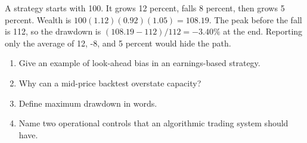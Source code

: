 \begin{worked}
A strategy starts with 100. It grows 12 percent, falls 8 percent, then grows 5 percent. Wealth is $100(1.12)(0.92)(1.05)=108.19$. The peak before the fall is 112, so the drawdown is $(108.19-112)/112=-3.40\%$ at the end. Reporting only the average of 12, -8, and 5 percent would hide the path.
\end{worked}

\begin{exerciseblock}
\begin{enumerate}
  \item Give an example of look-ahead bias in an earnings-based strategy.
  \item Why can a mid-price backtest overstate capacity?
  \item Define maximum drawdown in words.
  \item Name two operational controls that an algorithmic trading system should have.
\end{enumerate}
\end{exerciseblock}

